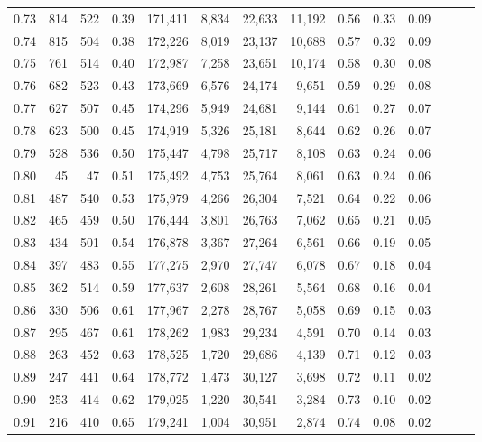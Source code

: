 \begin{tabular}{rrrrrrrrrrrrrr}
0.73 &    814 &  522 &  0.39 &  171,411 &    8,834 &  22,633 &  11,192 &  0.56 &  0.33 &      0.09 \\
0.74 &    815 &  504 &  0.38 &  172,226 &    8,019 &  23,137 &  10,688 &  0.57 &  0.32 &      0.09 \\
0.75 &    761 &  514 &  0.40 &  172,987 &    7,258 &  23,651 &  10,174 &  0.58 &  0.30 &      0.08 \\
0.76 &    682 &  523 &  0.43 &  173,669 &    6,576 &  24,174 &   9,651 &  0.59 &  0.29 &      0.08 \\
0.77 &    627 &  507 &  0.45 &  174,296 &    5,949 &  24,681 &   9,144 &  0.61 &  0.27 &      0.07 \\
0.78 &    623 &  500 &  0.45 &  174,919 &    5,326 &  25,181 &   8,644 &  0.62 &  0.26 &      0.07 \\
0.79 &    528 &  536 &  0.50 &  175,447 &    4,798 &  25,717 &   8,108 &  0.63 &  0.24 &      0.06 \\
0.80 &     45 &   47 &  0.51 &  175,492 &    4,753 &  25,764 &   8,061 &  0.63 &  0.24 &      0.06 \\
0.81 &    487 &  540 &  0.53 &  175,979 &    4,266 &  26,304 &   7,521 &  0.64 &  0.22 &      0.06 \\
0.82 &    465 &  459 &  0.50 &  176,444 &    3,801 &  26,763 &   7,062 &  0.65 &  0.21 &      0.05 \\
0.83 &    434 &  501 &  0.54 &  176,878 &    3,367 &  27,264 &   6,561 &  0.66 &  0.19 &      0.05 \\
0.84 &    397 &  483 &  0.55 &  177,275 &    2,970 &  27,747 &   6,078 &  0.67 &  0.18 &      0.04 \\
0.85 &    362 &  514 &  0.59 &  177,637 &    2,608 &  28,261 &   5,564 &  0.68 &  0.16 &      0.04 \\
0.86 &    330 &  506 &  0.61 &  177,967 &    2,278 &  28,767 &   5,058 &  0.69 &  0.15 &      0.03 \\
0.87 &    295 &  467 &  0.61 &  178,262 &    1,983 &  29,234 &   4,591 &  0.70 &  0.14 &      0.03 \\
0.88 &    263 &  452 &  0.63 &  178,525 &    1,720 &  29,686 &   4,139 &  0.71 &  0.12 &      0.03 \\
0.89 &    247 &  441 &  0.64 &  178,772 &    1,473 &  30,127 &   3,698 &  0.72 &  0.11 &      0.02 \\
0.90 &    253 &  414 &  0.62 &  179,025 &    1,220 &  30,541 &   3,284 &  0.73 &  0.10 &      0.02 \\
0.91 &    216 &  410 &  0.65 &  179,241 &    1,004 &  30,951 &   2,874 &  0.74 &  0.08 &      0.02 \\

\end{tabular}
